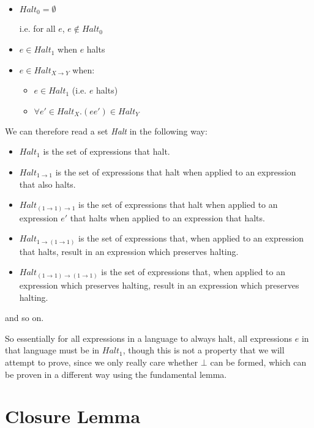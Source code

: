 \documentclass{article}
\begin{document}
\begin{itemize}
    \item $Halt_0 = \emptyset $ 
    
    i.e. for all $e$, $e \notin Halt_0$
    
    \item $e \in Halt_1$  when $e$ halts
    
    \item $e \in Halt_{X \to Y}$ when:
    
    \begin{itemize}
        \item $e \in Halt_1$  (i.e. $e$ halts)
        \item $\forall e' \in Halt_X. (e e') \in Halt_Y$
    \end{itemize}
\end{itemize}

We can therefore read a set \textit{Halt} in the following way:

\begin{itemize}
    \item $Halt_1$ is the set of expressions that halt.
    \item $Halt_{1 \to 1}$ is the set of expressions that halt when applied to an expression that also halts.
    \item $Halt_{(1 \to 1) \to 1}$ is the set of expressions that halt when applied to an expression $e'$ that halts when applied to an expression that halts.
    \item $Halt_{1 \to (1 \to 1)}$ is the set of expressions that, when applied to an expression that halts, result in an expression which preserves halting.
    \item $Halt_{(1 \to 1) \to (1 \to 1)}$ is the set of expressions that, when applied to an expression which preserves halting, result in an expression which preserves halting.
\end{itemize}

and so on.

So essentially for all expressions in a language to always halt, all expressions $e$ in that language must be in $Halt_1$, though this is not a property that we will attempt to prove, since we only really care whether $\bot$ can be formed, which can be proven in a different way using the fundamental lemma.

\newpage
\section{Closure Lemma}
\end{document}
